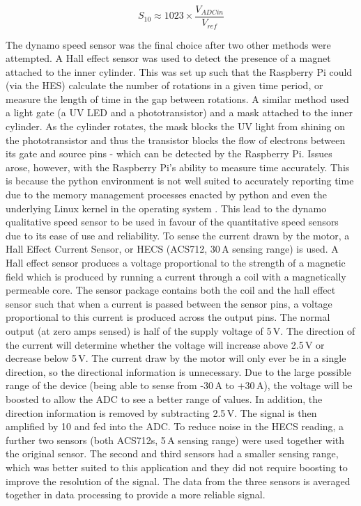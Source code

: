 \documentclass[twoside,a4]{report}
\def\br{\newline \newline \noindent}
\begin{document}
	\begin{equation}
	S_{10} \approx 1023 \times \frac{V_{ADCin}}{V_{ref}}
	\label{eqnadc}
	\end{equation}
	
	
	\noindent
	The dynamo speed sensor was the final choice after two other methods were attempted. A Hall effect sensor was used to detect the presence of a magnet attached to the inner cylinder. This was set up such that the Raspberry Pi could (via the HES) calculate the number of rotations in a given time period, or measure the length of time in the gap between rotations. A similar method used a light gate (a UV LED and a phototransistor) and a mask attached to the inner cylinder. As the cylinder rotates, the mask blocks the UV light from shining on the phototransistor and thus the transistor blocks the flow of electrons between its gate and source pins - which can be detected by the Raspberry Pi. Issues arose, however, with the Raspberry Pi's ability to measure time accurately. This is because the python environment is not well suited to accurately reporting time due to the memory management processes enacted by python and even the underlying Linux kernel in the operating system \cite{backrpibadrealtime}. This lead to the dynamo qualitative speed sensor to be used in favour of the quantitative speed sensors due to its ease of use and reliability.
	\br
	To sense the current drawn by the motor, a Hall Effect Current Sensor, or HECS (ACS712, 30\,A sensing range) is used. A Hall effect sensor produces a voltage proportional to the strength of a magnetic field which is produced by running a current through a coil with a magnetically permeable core. The sensor package contains both the coil and the hall effect sensor such that when a current is passed between the sensor pins, a voltage proportional to this current is produced across the output pins. The normal output (at zero amps sensed) is half of the supply voltage of 5\,V. The direction of the current will determine whether the voltage will increase above 2.5\,V or decrease below 5\,V. The current draw by the motor will only ever be in a single direction, so the directional information is unnecessary. Due to the large possible range of the device (being able to sense from -30\,A to +30\,A), the voltage will be boosted to allow the ADC to see a better range of values. In addition, the direction information is removed by subtracting 2.5\,V. The signal is then amplified by 10 and fed into the ADC. 
	\br
	To reduce noise in the HECS reading, a further two sensors (both ACS712s, 5\,A sensing range) were used together with the original sensor. The second and third sensors had a smaller sensing range, which was better suited to this application and they did not require boosting to improve the resolution of the signal. The data from the three sensors is averaged together in data processing to provide a more reliable signal.
	
\end{document}
